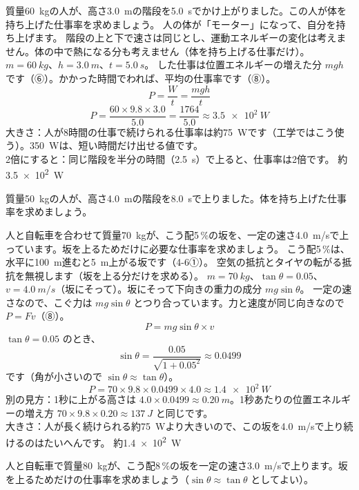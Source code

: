 \label{ph:力-4:ex7}
\begin{phreidai}[階段をかけ上がる人の仕事率]
質量\qty{60}{kg}の人が、高さ\qty{3.0}{m}の階段を\qty{5.0}{s}でかけ上がりました。この人が体を持ち上げた仕事率を求めましょう。
\phbamen
人の体が「モーター」になって、自分を持ち上げます。
\phmushi
階段の上と下で速さは同じとし、運動エネルギーの変化は考えません。体の中で熱になる分も考えません（体を持ち上げる仕事だけ）。
\phzu
$m=\qty{60}{kg}$、$h=\qty{3.0}{m}$、$t=\qty{5.0}{s}$。
\phriyu
した仕事は位置エネルギーの増えた分 $mgh$ です（⑥）。かかった時間でわれば、平均の仕事率です（⑧）。
\phtateru
\[P=\frac{W}{t}=\frac{mgh}{t}\]
\phtoku
\[P=\frac{60\times9.8\times3.0}{5.0}=\frac{1764}{5.0}\approx\qty{3.5e2}{W}\]
\phtashikame
大きさ：人が8時間の仕事で続けられる仕事率は約\qty{75}{W}です（工学ではこう使う）。\qty{350}{W}は、短い時間だけ出せる値です。\\
2倍にすると：同じ階段を半分の時間（\qty{2.5}{s}）で上ると、仕事率は2倍です。
\kotae 約\qty{3.5e2}{W}
\end{phreidai}
\begin{jibun}
質量\qty{50}{kg}の人が、高さ\qty{4.0}{m}の階段を\qty{8.0}{s}で上りました。体を持ち上げた仕事率を求めましょう。
\end{jibun}

\label{ph:力-4:ex8}
\begin{phreidai}[自転車で坂を上る]
人と自転車を合わせて質量\qty{70}{kg}が、こう配5\,\%の坂を、一定の速さ\qty{4.0}{m/s}で上っています。坂を上るためだけに必要な仕事率を求めましょう。
\phbamen
こう配5\,\%は、水平に\qty{100}{m}進むと\qty{5}{m}上がる坂です（\mbox{4-6①}）。
\phmushi
空気の抵抗とタイヤの転がる抵抗を無視します（坂を上る分だけを求める）。
\phzu
$m=\qty{70}{kg}$、$\tan\theta=0.05$、$v=\qty{4.0}{m/s}$（坂にそって）。坂にそって下向きの重力の成分 $mg\sin\theta$。
\phriyu
一定の速さなので、こぐ力は $mg\sin\theta$ とつり合っています。力と速度が同じ向きなので $P=Fv$（⑧）。
\phtateru
\[P=mg\sin\theta\times v\]
\phtoku
$\tan\theta=0.05$ のとき、
\[\sin\theta=\frac{0.05}{\sqrt{1+0.05^2}}\approx0.0499\]
です（角が小さいので $\sin\theta\approx\tan\theta$）。
\[P=70\times9.8\times0.0499\times4.0\approx\qty{1.4e2}{W}\]
\phtashikame
別の見方：1秒に上がる高さは $4.0\times0.0499\approx\qty{0.20}{m}$。1秒あたりの位置エネルギーの増え方 $70\times9.8\times0.20\approx\qty{137}{J}$ と同じです。\\
大きさ：人が長く続けられる約\qty{75}{W}より大きいので、この坂を\qty{4.0}{m/s}で上り続けるのはたいへんです。
\kotae 約\qty{1.4e2}{W}
\end{phreidai}
\begin{jibun}
人と自転車で質量\qty{80}{kg}が、こう配8\,\%の坂を一定の速さ\qty{3.0}{m/s}で上ります。坂を上るためだけの仕事率を求めましょう（$\sin\theta\approx\tan\theta$ としてよい）。
\end{jibun}

